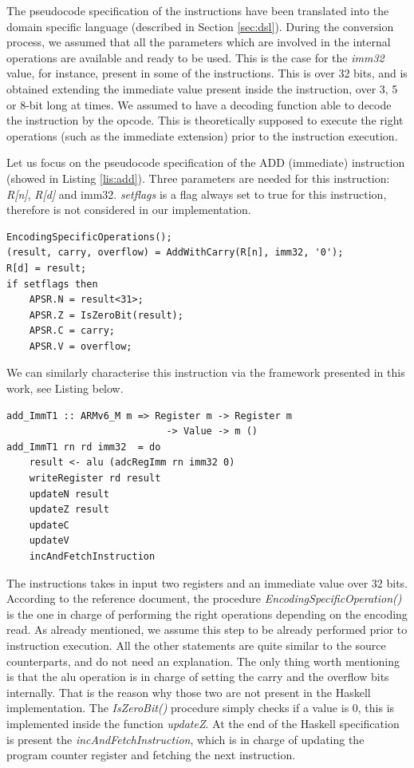 \documentclass[conference]{IEEEtran}
\begin{document}
The pseudocode specification of the instructions have been translated into the domain
specific language (described in Section \ref{sec:dsl}). During the conversion process, we
assumed that all the parameters which are involved in the internal operations are available
and ready to be used. This is the case for the \textit{imm32} value, for instance, present in
some of the instructions. This is over 32 bits, and is obtained extending the immediate value
present inside the instruction, over 3, 5 or 8-bit long at times. We assumed to have a
decoding function able to decode the instruction by the opcode. This is theoretically
supposed to execute the right operations (such as the immediate extension) prior to the
instruction execution.

Let us focus on the pseudocode specification of the ADD (immediate) instruction (showed in
Listing \ref{lis:add}). Three parameters are needed for this instruction: \textit{R[n]},
\textit{R[d]} and imm32. \textit{setflags} is a flag always set to true for this instruction,
therefore is not considered in our implementation.\\

\begin{lstlisting}[caption=ADD (immediate) instruction - Reference specification,
frame=single, label=lis:add]
EncodingSpecificOperations();
(result, carry, overflow) = AddWithCarry(R[n], imm32, '0');
R[d] = result;
if setflags then
	APSR.N = result<31>;
	APSR.Z = IsZeroBit(result);
	APSR.C = carry;
	APSR.V = overflow;
\end{lstlisting}

\noindent
We can similarly characterise this instruction via the framework presented in this work,
see Listing below.\\

\begin{lstlisting}[caption=ADD (immediate) instruction - Haskell-based specification,
frame=single, label=lis:addH]
add_ImmT1 :: ARMv6_M m => Register m -> Register m
							-> Value -> m ()
add_ImmT1 rn rd imm32  = do
    result <- alu (adcRegImm rn imm32 0)
    writeRegister rd result
    updateN result
    updateZ result
    updateC
    updateV
    incAndFetchInstruction
\end{lstlisting}

\noindent
The instructions takes in input two registers and an immediate value over 32 bits. According
to the reference document, the procedure \textit{EncodingSpecificOperation()} is the one in
charge of performing the right operations depending on the encoding read. As already
mentioned, we assume this step to be already performed prior to instruction execution. All
the other statements are quite similar to the source counterparts, and do not need an
explanation. The only thing worth mentioning is that the alu operation is in charge of
setting the carry and the overflow bits internally. That is the reason why those two are not
present in the Haskell implementation. The \textit{IsZeroBit()} procedure simply checks if a
value is 0, this is implemented inside the function \textit{updateZ}. At the end of the
Haskell specification is present the \textit{incAndFetchInstruction}, which is in charge of
updating the program counter register and fetching the next instruction.
\end{document}
